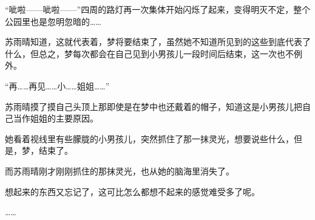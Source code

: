 “呲啦——呲啦——”四周的路灯再一次集体开始闪烁了起来，变得明灭不定，整个公园里也是忽明忽暗的……

苏雨晴知道，这就代表着，梦将要结束了，虽然她不知道所见到的这些到底代表了什么，但总之，梦每次都会在自己见到小男孩儿一段时间后结束，这一次也不例外。

“再……再见……小……姐姐……”

苏雨晴摸了摸自己头顶上那即使是在梦中也还戴着的帽子，知道这是小男孩儿把自己当作姐姐的主要原因。

她看着视线里有些朦胧的小男孩儿，突然抓住了那一抹灵光，想要说些什么，但是，梦，结束了。

而苏雨晴刚才刚刚抓住的那抹灵光，也从她的脑海里消失了。

想起来的东西又忘记了，这可比怎么都想不起来的感觉难受多了呢。

……
